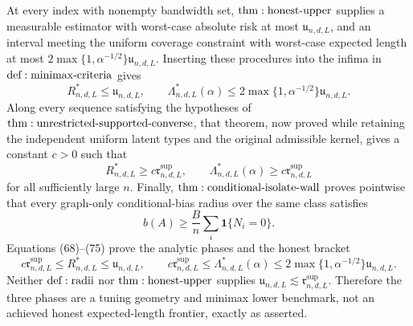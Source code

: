 At every index with nonempty bandwidth set, \({\rm thm:honest\text{-}upper}\) supplies a measurable estimator with worst-case absolute risk at most \(\mathfrak u_{n,d,L}\), and an interval meeting the uniform coverage constraint with worst-case expected length at most \(2\max\{1,\alpha^{-1/2}\}\mathfrak u_{n,d,L}\).  Inserting these procedures into the infima in \({\rm def:minimax\text{-}criteria}\) gives
\[
 R^*_{n,d,L}\leq\mathfrak u_{n,d,L},
 \qquad
 \Lambda^*_{n,d,L}(\alpha)
 \leq2\max\{1,\alpha^{-1/2}\}\mathfrak u_{n,d,L}.
\tag{73}
\]
Along every sequence satisfying the hypotheses of \({\rm thm:unrestricted\text{-}supported\text{-}converse}\), that theorem, now proved while retaining the independent uniform latent types and the original admissible kernel, gives a constant \(c>0\) such that
\[
 R^*_{n,d,L}\geq c\mathfrak r^{\mathrm{sup}}_{n,d,L},
 \qquad
 \Lambda^*_{n,d,L}(\alpha)\geq c\mathfrak r^{\mathrm{sup}}_{n,d,L}
\tag{74}
\]
for all sufficiently large \(n\).  Finally, \({\rm thm:conditional\text{-}isolate\text{-}wall}\) proves pointwise that every graph-only conditional-bias radius over the same class satisfies
\[
 b(A)\geq\frac Bn\sum_i\mathbf1\{N_i=0\}.
\tag{75}
\]
Equations (68)--(75) prove the analytic phases and the honest bracket
\[
 c\mathfrak r^{\mathrm{sup}}_{n,d,L}
 \leq R^*_{n,d,L}\leq\mathfrak u_{n,d,L},
 \qquad
 c\mathfrak r^{\mathrm{sup}}_{n,d,L}
 \leq\Lambda^*_{n,d,L}(\alpha)
 \leq2\max\{1,\alpha^{-1/2}\}\mathfrak u_{n,d,L}.
\tag{76}
\]
Neither \({\rm def:radii}\) nor \({\rm thm:honest\text{-}upper}\) supplies \(\mathfrak u_{n,d,L}\lesssim\mathfrak r^{\mathrm{sup}}_{n,d,L}\).  Therefore the three phases are a tuning geometry and minimax lower benchmark, not an achieved honest expected-length frontier, exactly as asserted.